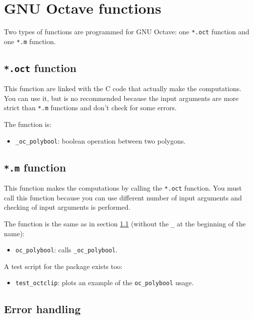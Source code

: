 \documentclass[10pt,a4paper]{article}
\newcommand{\octave}{GNU Octave}
\begin{document}
\section{\octave{} functions}

Two types of functions are programmed for \octave: one \texttt{*.oct} function
and one \texttt{*.m} function.

\subsection{\texttt{*.oct} function}
\label{op-of}

This function are linked with the C code that actually make the computations.
You can use it, but is no recommended because the input arguments are more
strict than \texttt{*.m} functions and don't check for some errors.

The function is:
\begin{itemize}
\item \texttt{\_oc\_polybool}: boolean operation between two polygons.
\end{itemize}

\subsection{\texttt{*.m} function}

This function makes the computations by calling the \texttt{*.oct} function. You
must call this function because you can use different number of input arguments
and checking of input arguments is performed.

The function is the same as in section \ref{op-of} (without the \texttt{\_} at
the beginning of the name):
\begin{itemize}
\item \texttt{oc\_polybool}: calls \texttt{\_oc\_polybool}.
\end{itemize}

A test script for the package exists too:

\begin{itemize}
\item \texttt{test\_octclip}: plots an example of the \texttt{oc\_polybool}
      usage.
\end{itemize}

\subsection{Error handling}
\end{document}
